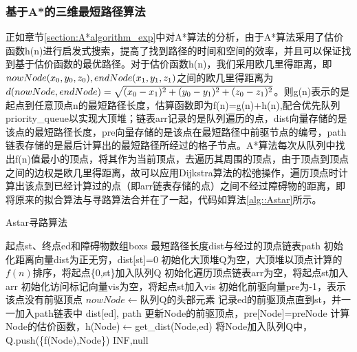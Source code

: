 \subsubsection{基于A*的三维最短路径算法}
\par 正如章节\ref{section:A*algorithm_exp}中对A*算法的分析，由于A*算法采用了估价函数h(n)进行启发式搜索，提高了找到路径的时间和空间的效率，并且可以保证找到基于估价函数的最优路径。对于估价函数h(n)，我们采用欧几里得距离，即$nowNode(x_0,y_0,z_0),\\endNode(x_1,y_1,z_1)$之间的欧几里得距离为$d(nowNode,endNode)=\\\sqrt{(x_0-x_1)^2+(y_0-y_1)^2+(z_0-z_1)^2}$。则g(n)表示的是起点到任意顶点n的最短路径长度，估算函数即为f(n)=g(n)+h(n),配合优先队列priority\_queue以实现大顶堆；链表arr记录的是队列遍历的点，dist向量存储的是该点的最短路径长度，pre向量存储的是该点在最短路径中前驱节点的编号，path链表存储的是最后计算出的最短路径所经过的格子节点。A*算法每次从队列中找出f(n)值最小的顶点，将其作为当前顶点，去遍历其周围的顶点，由于顶点到顶点之间的边权是欧几里得距离，故可以应用Dijkstra算法的松弛操作，遍历顶点时计算出该点到已经计算过的点（即arr链表存储的点）之间不经过障碍物的距离，即将原来的拟合算法与寻路算法合并在了一起，代码如算法\ref{alg::Astar}所示。
%
\begin{algorithm}[!htb]
    \caption{Astar寻路算法}
    \label{alg::Astar}
    \begin{algorithmic}[1]
        \Require 起点st、终点ed和障碍物数组boxs
        \Ensure 最短路径长度dist与经过的顶点链表path
            \State 初始化距离向量dist为正无穷，dist[st]=0
            \State 初始化大顶堆Q为空，大顶堆以顶点计算的$f(n)$排序，将起点\{0,st\}加入队列Q
            \State 初始化遍历顶点链表arr为空，将起点st加入arr
            \State 初始化访问标记向量vis为空，将起点st加入vis
            \State 初始化前驱向量pre为-1，表示该点没有前驱顶点
                \State $nowNode\gets$队列Q的头部元素
                    \State 记录ed的前驱顶点直到st，并一一加入path链表中
                    \State \Return dist[ed], path
                \EndIf
                                \State 更新Node的前驱顶点，pre[Node]=preNode
                            \EndIf
                        \EndFor
                        \State 计算Node的估价函数，h(Node)$\gets$get\_dist(Node,ed)
                        \State 将Node加入队列Q中，Q.push(\{f(Node),Node\})
                    \EndIf
                \EndWhile
            \EndWhile
            \State \Return INF,null
        \EndFunction
    \end{algorithmic}
\end{algorithm}

